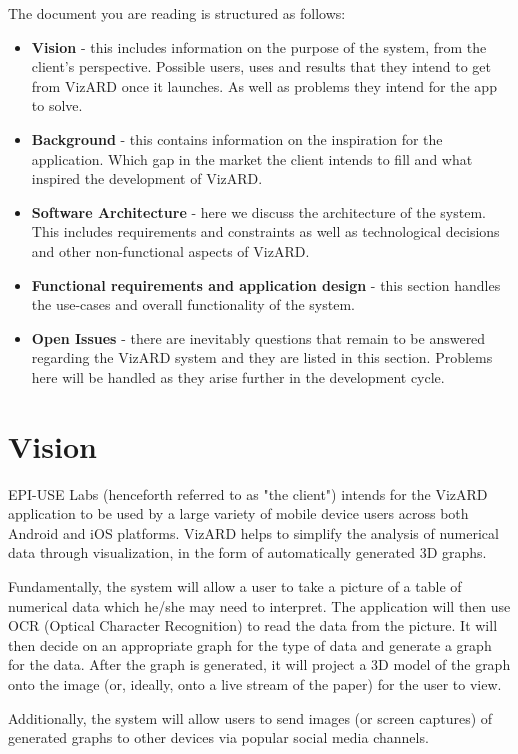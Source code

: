 \documentclass[a4paper,12pt]{article}
\begin{document}
The document you are reading is structured as follows:
\begin{itemize}
	\item \textbf{Vision} - this includes information on the purpose of the system, from the client's perspective. Possible users, uses and results that they intend to get from VizARD once it launches. As well as problems they intend for the app to solve.
	\item \textbf{Background} - this contains information on the inspiration for the application. Which gap in the market the client intends to fill and what inspired the development of VizARD.
	\item \textbf{Software Architecture} - here we discuss the architecture of the system.
	This includes requirements and constraints as well as technological decisions and other non-functional aspects of VizARD.
	\item \textbf{Functional requirements and application design} - this section handles the use-cases and overall functionality of the system.
	\item \textbf{Open Issues} - there are inevitably questions that remain to be answered regarding the VizARD system and they are listed in this section. Problems here will be handled as they arise further in the development cycle.
\end{itemize}

\newpage
\section{Vision}
EPI-USE Labs (henceforth referred to as "the client") intends for the VizARD application to be used by a large variety of mobile device users across both Android and iOS platforms. VizARD helps to simplify the analysis of numerical data through visualization, in the form of automatically generated 3D graphs.

Fundamentally, the system will allow a user to take a picture of a table of numerical data which he/she may need to interpret. The application will then use OCR (Optical Character Recognition) to read the data from the picture. It will then decide on an appropriate graph for the type of data and generate a graph for the data. After the graph is generated, it will project a 3D model of the graph onto the image (or, ideally, onto a live stream of the paper) for the user to view.

Additionally, the system will allow users to send images (or screen captures) of generated graphs to other devices via popular social media channels.
\end{document}
